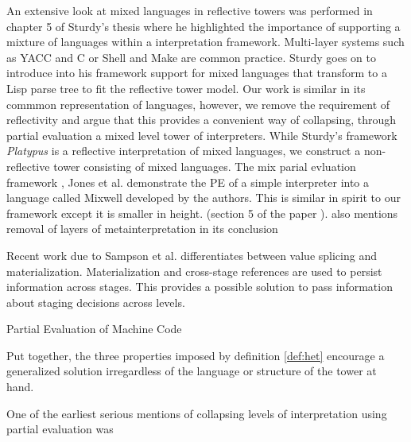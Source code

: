 \documentclass[fleqn]{article}
\theoremstyle{definition}
\begin{document}
An extensive look at mixed languages in reflective towers was performed in chapter 5 of Sturdy's thesis \cite{sturdy1993lisp} where he highlighted the importance of supporting a mixture of languages within a interpretation framework. Multi-layer systems such as YACC and C or Shell and Make are common practice. Sturdy goes on to introduce into his framework support for mixed languages that transform to a Lisp parse tree to fit the reflective tower model. Our work is similar in its commmon representation of languages, however, we remove the requirement of reflectivity and argue that this provides a convenient way of collapsing, through partial evaluation a mixed level tower of interpreters. While Sturdy's framework \textit{Platypus} is a reflective interpretation of mixed languages, we construct a non-reflective tower consisting of mixed languages.
\pagebreak
The mix parial evluation framework \cite{jones1989mix}, Jones et al. demonstrate the PE of a simple interpreter into a language called Mixwell developed by the authors. This is similar in spirit to our framework except it is smaller in height. (section 5 of the paper \cite{jones1989mix}). also mentions removal of layers of metainterpretation in its conclusion

Recent work due to Sampson et al. \cite{sampson2017static} differentiates between value splicing and materialization. Materialization and cross-stage references are used to persist information across stages. This provides a possible solution to pass information about staging decisions across levels.

Partial Evaluation of Machine Code

Put together, the three properties imposed by definition \ref{def:het} encourage a generalized solution irregardless of the language or structure of the tower at hand.

One of the earliest serious mentions of collapsing levels of interpretation using partial evaluation was \cite{sturdy1993lisp}

\end{document}

